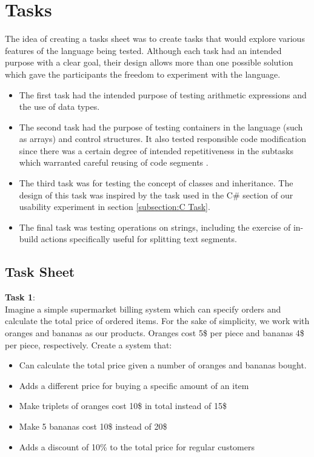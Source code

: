 \section{Tasks}
The idea of creating a tasks sheet was to create tasks that would explore various features of the language being tested. Although each task had an intended purpose with a clear goal, their design allows more than one possible solution which gave the participants the freedom to experiment with the language.
\begin{itemize}
\item The first task had the intended purpose of testing arithmetic expressions and the use of data types.
\item The second task had the purpose of testing containers in the language (such as arrays) and control structures.
It also tested responsible code modification since there was a certain degree of intended repetitiveness in the subtasks which warranted careful reusing of code segments .%
\item The third task was for testing the concept of classes and inheritance. The design of this task was inspired by the task used in the C\# section of our usability experiment in section \ref{subsection:C Task}.
\item The final task was testing operations on strings, including the exercise of in-build actions specifically useful for splitting text segments.
\end{itemize}

\subsection{Task Sheet}
\textbf{Task 1}:\\
Imagine a simple supermarket billing system which can specify orders and calculate the total price of ordered items. For the sake of simplicity, we work with oranges and bananas as our products. Oranges cost 5\$ per piece and bananas 4\$ per piece, respectively. Create a system that:
\begin{itemize}
\item Can calculate the total price given a number of oranges and bananas bought.
\item Adds a different price for buying a specific amount of an item 
\item Make triplets of oranges cost 10\$ in total instead of 15\$
\item Make 5 bananas cost 10\$ instead of 20\$
\item Adds a discount of 10\% to the total price for regular customers
\end{itemize}

